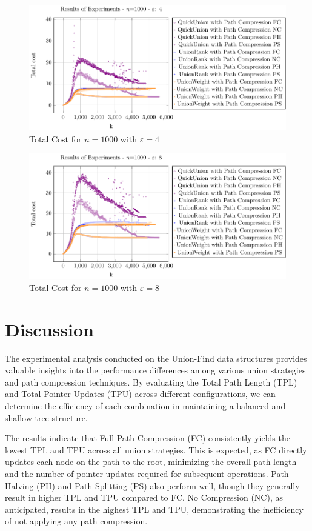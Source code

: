 \documentclass[10pt,a4paper,hidelinks]{article}
\begin{document}
\begin{figure}[h!]
    \centering
    \includegraphics[width=0.80\linewidth]{plots/plot_1000_Total_cost_epsilon_4.pdf}
    \caption{Total Cost for $n = 1000$ with $\varepsilon = 4$}
\end{figure}

\begin{figure}[h!]
    \centering
    \includegraphics[width=0.80\linewidth]{plots/plot_1000_Total_cost_epsilon_8.pdf}
    \caption{Total Cost for $n = 1000$ with $\varepsilon = 8$}
\end{figure}


\newpage
\section{Discussion}

The experimental analysis conducted on the Union-Find data structures provides valuable insights into the performance differences among various union strategies and path compression techniques. By evaluating the Total Path Length (TPL) and Total Pointer Updates (TPU) across different configurations, we can determine the efficiency of each combination in maintaining a balanced and shallow tree structure.

The results indicate that Full Path Compression (FC) consistently yields the lowest TPL and TPU across all union strategies. This is expected, as FC directly updates each node on the path to the root, minimizing the overall path length and the number of pointer updates required for subsequent operations. Path Halving (PH) and Path Splitting (PS) also perform well, though they generally result in higher TPL and TPU compared to FC. No Compression (NC), as anticipated, results in the highest TPL and TPU, demonstrating the inefficiency of not applying any path compression.
\end{document}
